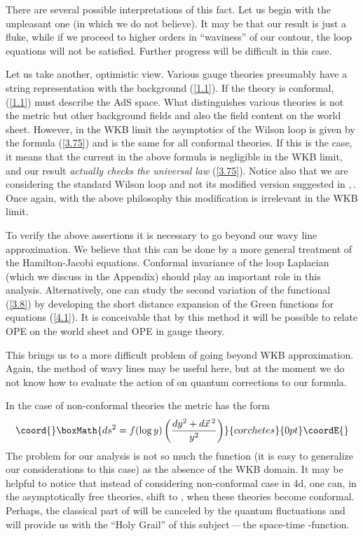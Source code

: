 \documentclass[a4paper,12pt]{article}
\numberwithin{equation}{section}
\begin{document}
There are several possible interpretations of this fact. Let us begin with the
unpleasant one (in which we do not believe). It may be that our result is just
a fluke, while if we proceed to higher orders in ``waviness'' of our contour,
the loop equations will not be satisfied. Further progress will be difficult
in this case.

Let us take another, optimistic view. Various gauge theories presumably have
a string representation with the background (\ref{1.1}). If the theory is conformal,
(\ref{1.1}) must describe the AdS space. What distinguishes various theories
is not the metric but other background fields and also the field content on
the world sheet. However, in the WKB limit \coordHE{} the
asymptotics of the Wilson loop is given by the formula (\ref{3.75}) and is
the same for all conformal theories. If this is the case, it means that the
current in the above formula is negligible in the WKB limit, and our result
\emph{actually checks the universal law} (\ref{3.75}). Notice also that we
are considering the standard Wilson loop and not its modified version suggested
in \cite{13},\,\cite{14}. Once again, with the above philosophy this modification
is irrelevant in the WKB limit. 

To verify the above assertions it is necessary to go beyond our wavy line approximation.
We believe that this can be done by a more general treatment of the Hamilton-Jacobi
equations. Conformal invariance of the loop Laplacian (which we discuss in the
Appendix) should play an important role in this analysis. Alternatively, one
can study the second variation of the functional (\ref{3.8}) by developing
the short distance expansion of the Green functions for equations (\ref{4.1}).
It is conceivable that by this method it will be possible to relate OPE on the
world sheet and OPE in gauge theory. 

This brings us to a more difficult problem of going beyond WKB approximation.
Again, the method of wavy lines may be useful here, but at the moment we do
not know how to evaluate the action of \coordHE{} on quantum corrections
to our formula. 

In the case of non-conformal theories the metric has the form
\[\coord{}\boxMath{
ds^{2}=f(\log y)\left( \frac{dy^{2}+d\vec{x}\, ^{2}}{y^{2}}\right) }{corchetes}{0pt}\coordE{}\]
 The problem for our analysis is not so much the function \coordHE{} (it is easy
to generalize our considerations to this case) as the absence of the WKB domain.
It may be helpful to notice that instead of considering non-conformal case in
4d, one can, in the asymptotically free theories, shift to \coordHE{},
when these theories become conformal. Perhaps, the classical part of \coordHE{}
will be canceled by the quantum fluctuations and will provide us with the ``Holy
Grail'' of this subject\,---\,the space-time \myHighlight{\( \beta  \)}\coordHE{}-function. 
\end{document}

